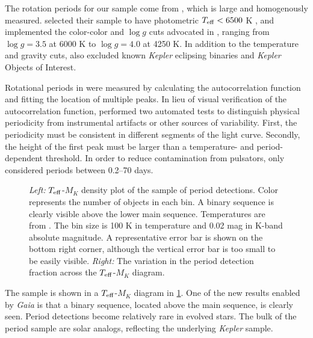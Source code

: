 \documentclass[manuscript]{aastex6}
\newcommand{\Kepler}{\mbox{\textit{Kepler}}}
\newcommand{\Gaia}{\mbox{\textit{Gaia}}}
\newcommand{\Teff}{\ensuremath{T_{\rm eff}}}
\newcommand{\logg}{\ensuremath{\log g}}
\begin{document}
The rotation periods for our sample come from \citet{McQuillan14}, which
is large and homogenously measured. \citet{McQuillan14} selected their sample 
to have photometric \(\Teff < 6500\) K \citep{Brown11,Dressing13}, and 
implemented the color-color and \logg{} cuts advocated in \citet{Ciardi11}, 
ranging from \(\logg = 3.5\) at 6000 K to \(\logg = 4.0\) at 4250 K. 
In addition to the temperature and gravity cuts, \citet{McQuillan14} also 
excluded known \Kepler{} eclipsing binaries and \Kepler{} Objects of Interest. 

Rotational periods in \citet{McQuillan14} were measured by calculating the 
autocorrelation function and fitting the location of multiple peaks. In lieu 
of visual verification of the autocorrelation function, \citet{McQuillan14}
performed two automated tests to distinguish physical periodicity from
instrumental artifacts or other sources of variability. First, the 
periodicity must be consistent in different segments of the light curve.
Secondly, the height of the first peak must be larger than a temperature- and
period-dependent threshold. In order to reduce contamination from pulsators, 
\citet{McQuillan14} only considered periods between 0.2--70 days.

\begin{figure*}[htb]
    \centering
    \caption{\emph{Left:} \Teff-\(M_K\) density plot of the sample of
        \citet{McQuillan14} period detections. Color represents the number of
        objects in each bin. A binary sequence is clearly 
        visible above the lower main sequence. Temperatures are from
        \citet{Pinsonneault12}. The bin size is 100 K in
        temperature and 0.02 mag in K-band absolute magnitude. A 
        representative error bar is shown on the bottom right corner, although
        the vertical error bar is too small to be easily visible. 
        \emph{Right:} The variation in the \citet{McQuillan14} period 
        detection fraction across the \Teff-\(M_K\) 
    diagram.}\label{fig:mcquillan_selection}
\end{figure*}

The \citet{McQuillan14} sample is shown in a \Teff-\(M_K\)
diagram in \cref{fig:mcquillan_selection}. One of the new results enabled by 
\Gaia{} is that a binary sequence,
located above the main sequence, is clearly seen. Period detections become
relatively rare in evolved stars. The bulk of the period sample are solar
analogs, reflecting the underlying \Kepler{} sample.
\end{document}
